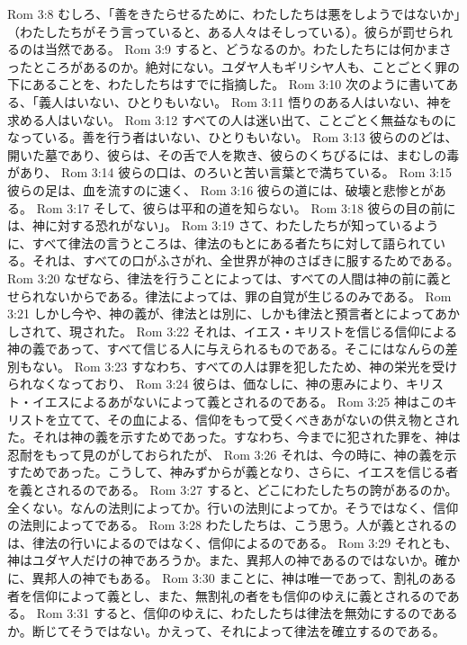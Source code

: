 Rom 3:8  むしろ、「善をきたらせるために、わたしたちは悪をしようではないか」（わたしたちがそう言っていると、ある人々はそしっている）。彼らが罰せられるのは当然である。
Rom 3:9  すると、どうなるのか。わたしたちには何かまさったところがあるのか。絶対にない。ユダヤ人もギリシヤ人も、ことごとく罪の下にあることを、わたしたちはすでに指摘した。
Rom 3:10  次のように書いてある、「義人はいない、ひとりもいない。
Rom 3:11  悟りのある人はいない、神を求める人はいない。
Rom 3:12  すべての人は迷い出て、ことごとく無益なものになっている。善を行う者はいない、ひとりもいない。
Rom 3:13  彼らののどは、開いた墓であり、彼らは、その舌で人を欺き、彼らのくちびるには、まむしの毒があり、
Rom 3:14  彼らの口は、のろいと苦い言葉とで満ちている。
Rom 3:15  彼らの足は、血を流すのに速く、
Rom 3:16  彼らの道には、破壊と悲惨とがある。
Rom 3:17  そして、彼らは平和の道を知らない。
Rom 3:18  彼らの目の前には、神に対する恐れがない」。
Rom 3:19  さて、わたしたちが知っているように、すべて律法の言うところは、律法のもとにある者たちに対して語られている。それは、すべての口がふさがれ、全世界が神のさばきに服するためである。
Rom 3:20  なぜなら、律法を行うことによっては、すべての人間は神の前に義とせられないからである。律法によっては、罪の自覚が生じるのみである。
Rom 3:21  しかし今や、神の義が、律法とは別に、しかも律法と預言者とによってあかしされて、現された。
Rom 3:22  それは、イエス・キリストを信じる信仰による神の義であって、すべて信じる人に与えられるものである。そこにはなんらの差別もない。
Rom 3:23  すなわち、すべての人は罪を犯したため、神の栄光を受けられなくなっており、
Rom 3:24  彼らは、価なしに、神の恵みにより、キリスト・イエスによるあがないによって義とされるのである。
Rom 3:25  神はこのキリストを立てて、その血による、信仰をもって受くべきあがないの供え物とされた。それは神の義を示すためであった。すなわち、今までに犯された罪を、神は忍耐をもって見のがしておられたが、
Rom 3:26  それは、今の時に、神の義を示すためであった。こうして、神みずからが義となり、さらに、イエスを信じる者を義とされるのである。
Rom 3:27  すると、どこにわたしたちの誇があるのか。全くない。なんの法則によってか。行いの法則によってか。そうではなく、信仰の法則によってである。
Rom 3:28  わたしたちは、こう思う。人が義とされるのは、律法の行いによるのではなく、信仰によるのである。
Rom 3:29  それとも、神はユダヤ人だけの神であろうか。また、異邦人の神であるのではないか。確かに、異邦人の神でもある。
Rom 3:30  まことに、神は唯一であって、割礼のある者を信仰によって義とし、また、無割礼の者をも信仰のゆえに義とされるのである。
Rom 3:31  すると、信仰のゆえに、わたしたちは律法を無効にするのであるか。断じてそうではない。かえって、それによって律法を確立するのである。
